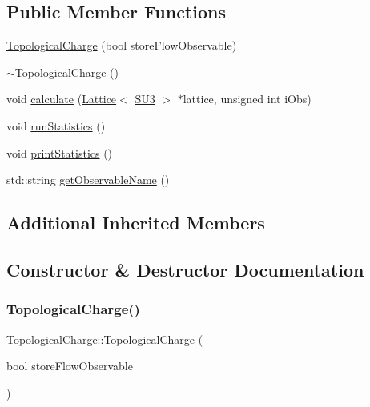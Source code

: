 \subsection*{Public Member Functions}
\begin{DoxyCompactItemize}
\item 
\mbox{\hyperlink{class_topological_charge_a415e32f865f7b5c83f4ac4471838d514}{Topological\+Charge}} (bool store\+Flow\+Observable)
\item 
\mbox{\hyperlink{class_topological_charge_aec647c5c45f8532639cebcac10865f2e}{$\sim$\+Topological\+Charge}} ()
\item 
void \mbox{\hyperlink{class_topological_charge_a8ed78c28c3484df04b1cb24187de2f5b}{calculate}} (\mbox{\hyperlink{class_lattice}{Lattice}}$<$ \mbox{\hyperlink{class_s_u3}{S\+U3}} $>$ $\ast$lattice, unsigned int i\+Obs)
\item 
void \mbox{\hyperlink{class_topological_charge_ab9afadb9f37e638c0a168ebab5d41353}{run\+Statistics}} ()
\item 
void \mbox{\hyperlink{class_topological_charge_ad56263921d283d315b04ab40c9594a2c}{print\+Statistics}} ()
\item 
std\+::string \mbox{\hyperlink{class_topological_charge_ad12d246692f3d9ea0ef591814010ef88}{get\+Observable\+Name}} ()
\end{DoxyCompactItemize}
\subsection*{Additional Inherited Members}


\subsection{Constructor \& Destructor Documentation}
\mbox{\label{class_topological_charge_a415e32f865f7b5c83f4ac4471838d514}} 
\subsubsection{\texorpdfstring{TopologicalCharge()}{TopologicalCharge()}}
{\footnotesize\ttfamily Topological\+Charge\+::\+Topological\+Charge (\begin{DoxyParamCaption}\item[{bool}]{store\+Flow\+Observable }\end{DoxyParamCaption})}

